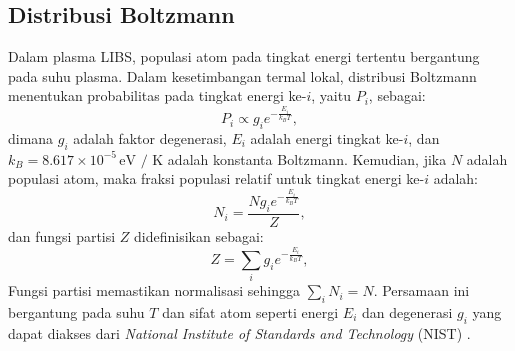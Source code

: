 \subsection{Distribusi Boltzmann}
Dalam plasma LIBS, populasi atom pada tingkat energi tertentu bergantung pada suhu plasma. Dalam kesetimbangan termal lokal, distribusi Boltzmann menentukan probabilitas pada tingkat energi ke-\( i \), yaitu \( P_i \), sebagai:
\begin{equation}
P_i \propto g_i e^{-\frac{E_i}{k_B T}}, \label{eq:boltzmann_propto}
\end{equation}
dimana \( g_i \) adalah faktor degenerasi, \( E_i \) adalah energi tingkat ke-\( i \), dan \( k_B = 8.617 \times 10^{-5} \, \text{eV / K} \) adalah konstanta Boltzmann. Kemudian, jika \( N \) adalah populasi atom, maka fraksi populasi relatif untuk tingkat energi ke-\( i \) adalah:
\begin{equation}
N_i = \frac{N g_i e^{-\frac{E_i}{k_B T}}}{Z}, \label{eq:boltzmann1}
\end{equation}
dan fungsi partisi \( Z \) didefinisikan sebagai:
\begin{equation}
Z = \sum_i g_i e^{-\frac{E_i}{k_B T}}, \label{eq:partition}
\end{equation}
Fungsi partisi memastikan normalisasi sehingga \( \sum_i N_i = N \). Persamaan ini bergantung pada suhu \( T \) dan sifat atom seperti energi \( E_i \) dan degenerasi \( g_i \) yang dapat diakses dari \textit{National Institute of Standards and Technology} (NIST) \citep{Pathria2011,Rybicki1985}.

